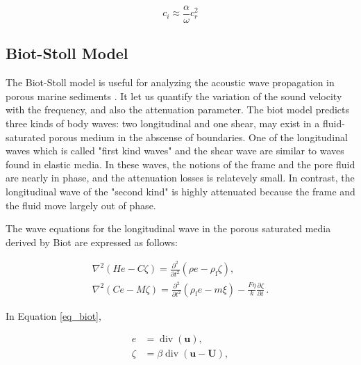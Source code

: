 \documentclass{article}[a4paper, 12pt]
\begin{document}
\begin{equation}
    c_i \approx \frac{\alpha}{\omega}c_r^2
\end{equation}
 

\subsection*{Biot-Stoll Model}

The Biot-Stoll model is useful for analyzing the acoustic wave propagation in porous marine sediments \cite{kimura2007study}. It let us quantify the variation of the sound velocity with the frequency, and also the attenuation parameter. The biot model predicts three kinds of body waves: two longitudinal and one shear, may exist in a fluid-saturated porous medium in the abscense of boundaries. One of the longitudinal waves which is called "first kind waves" and the shear wave are similar to waves found in elastic media. In these waves, the notions of the frame and the pore fluid are nearly in phase, and the attenuation losses is relatevely small. In contrast, the longitudinal wave of the "second kind" is highly attenuated because the frame and the fluid move largely out of phase.

The wave equations for the longitudinal wave in the porous saturated media derived by Biot are expressed as follows:

\begin{equation}\label{eq_biot}
    \begin{array} {l} {{\nabla^{2} ( H e-C \zeta)=\displaystyle\frac{\partial^{2}} {\partial t^{2}} ( \rho e-\rho_{\mathrm{f}} \zeta),}} \\[3.5ex] {{\nabla^{2} ( C e-M \zeta)=\displaystyle\frac{\partial^{2}} {\partial t^{2}} ( \rho_{\mathrm{f}} e-m \xi)-\displaystyle\frac{F \eta} {k} \displaystyle\frac{\partial\zeta} {\partial t} \,.}} \end{array}
\end{equation}

In Equation \eqref{eq_biot},


$$ 
\begin{aligned}
    e&=\operatorname{d i v} ( \bm{u} ),\\[1.5ex]
    \zeta&=\beta\operatorname{d i v} ( \bm{u}-\bm{U} ),
\end{aligned}
 $$
\end{document}
